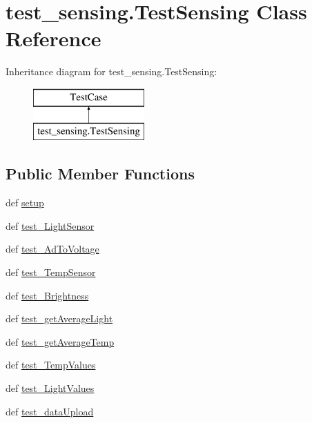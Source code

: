 \hypertarget{classtest__sensing_1_1_test_sensing}{\section{test\-\_\-sensing.\-Test\-Sensing Class Reference}
\label{classtest__sensing_1_1_test_sensing}
}
Inheritance diagram for test\-\_\-sensing.\-Test\-Sensing\-:\begin{figure}[H]
\begin{center}
\leavevmode
\includegraphics[height=2.000000cm]{classtest__sensing_1_1_test_sensing}
\end{center}
\end{figure}
\subsection*{Public Member Functions}
\begin{DoxyCompactItemize}
\item 
def \hyperlink{classtest__sensing_1_1_test_sensing_a8108831848700c03f289e756d849268b}{setup}
\item 
def \hyperlink{classtest__sensing_1_1_test_sensing_a0d1b334a31f4dea05ffd10d032069bd6}{test\-\_\-\-Light\-Sensor}
\item 
def \hyperlink{classtest__sensing_1_1_test_sensing_a802bdd98a70aa6a84a209086b12221a1}{test\-\_\-\-Ad\-To\-Voltage}
\item 
def \hyperlink{classtest__sensing_1_1_test_sensing_ac31ab35d2d8ef9a50d0e87f340334450}{test\-\_\-\-Temp\-Sensor}
\item 
def \hyperlink{classtest__sensing_1_1_test_sensing_a717dd22a6e75d4ee779e0166e94650e4}{test\-\_\-\-Brightness}
\item 
def \hyperlink{classtest__sensing_1_1_test_sensing_ab9941e0d91e0fe888370b944ce2b4268}{test\-\_\-get\-Average\-Light}
\item 
def \hyperlink{classtest__sensing_1_1_test_sensing_a5cd237ffd24b7488f396f51713c1e345}{test\-\_\-get\-Average\-Temp}
\item 
def \hyperlink{classtest__sensing_1_1_test_sensing_aa693842a90e63302ad1084786b463e4e}{test\-\_\-\-Temp\-Values}
\item 
def \hyperlink{classtest__sensing_1_1_test_sensing_a5d12277fd768c888e5c289368b1b9db3}{test\-\_\-\-Light\-Values}
\item 
def \hyperlink{classtest__sensing_1_1_test_sensing_a3f232e857f0b52f491838894d6341ff5}{test\-\_\-data\-Upload}
\end{DoxyCompactItemize}


